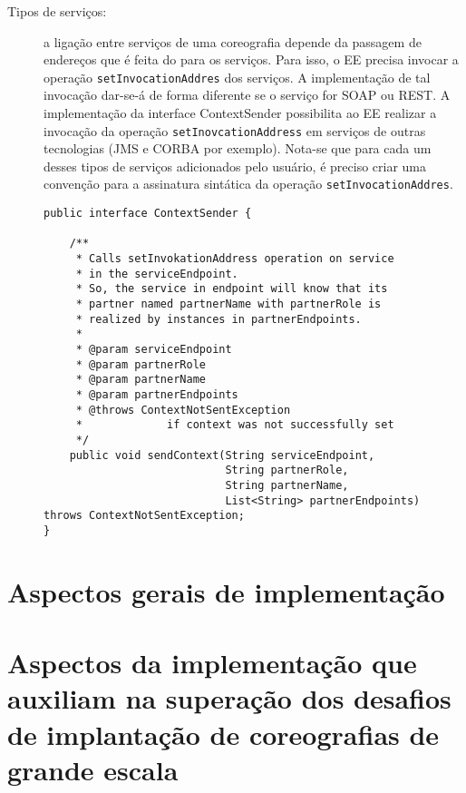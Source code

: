 \begin{description}
\item [Tipos de serviços:] a ligação entre serviços de uma coreografia depende da passagem de endereços que é feita do \ee para os serviços. Para isso, o EE precisa invocar a operação \texttt{setInvocationAddres} dos serviços. A implementação de tal invocação dar-se-á de forma diferente se o serviço for SOAP ou REST. A implementação da interface \textsf{ContextSender} possibilita ao EE realizar a invocação da operação \texttt{setInovcationAddress} em serviços de outras tecnologias (JMS e CORBA por exemplo). Nota-se que para cada um desses tipos de serviços adicionados pelo usuário, é preciso criar uma convenção para a assinatura sintática da operação \texttt{setInvocationAddres}.

\begin{lstlisting}[frame=trbl, label=lst:context_sender, caption=Interface ContextSender.]
public interface ContextSender {

    /**
     * Calls setInvokationAddress operation on service 
     * in the serviceEndpoint.
     * So, the service in endpoint will know that its 
     * partner named partnerName with partnerRole is 
     * realized by instances in partnerEndpoints.
     * 
     * @param serviceEndpoint
     * @param partnerRole
     * @param partnerName
     * @param partnerEndpoints
     * @throws ContextNotSentException
     *             if context was not successfully set
     */
    public void sendContext(String serviceEndpoint, 
                            String partnerRole, 
                            String partnerName, 
                            List<String> partnerEndpoints) throws ContextNotSentException;
}
\end{lstlisting}

\end{description}


\section{Aspectos gerais de implementação}

\section{Aspectos da implementação que auxiliam na superação dos desafios de implantação de coreografias de grande escala}
